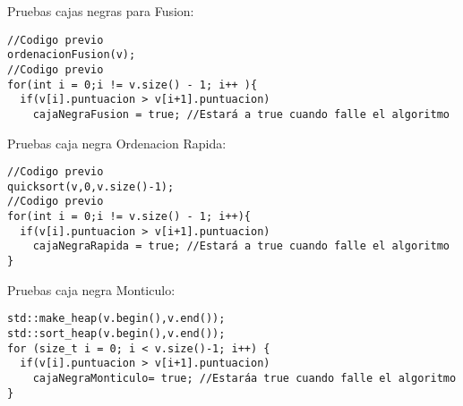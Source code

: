 Pruebas cajas negras para Fusion:
\begin{lstlisting}
//Codigo previo
ordenacionFusion(v);
//Codigo previo
for(int i = 0;i != v.size() - 1; i++ ){
  if(v[i].puntuacion > v[i+1].puntuacion)
    cajaNegraFusion = true; //Estará a true cuando falle el algoritmo
\end{lstlisting}

Pruebas caja negra Ordenacion Rapida:
\begin{lstlisting}
//Codigo previo
quicksort(v,0,v.size()-1);
//Codigo previo
for(int i = 0;i != v.size() - 1; i++){
  if(v[i].puntuacion > v[i+1].puntuacion)
    cajaNegraRapida = true; //Estará a true cuando falle el algoritmo
}
\end{lstlisting}

Pruebas caja negra Monticulo:
\begin{lstlisting}
std::make_heap(v.begin(),v.end());
std::sort_heap(v.begin(),v.end());
for (size_t i = 0; i < v.size()-1; i++) {
  if(v[i].puntuacion > v[i+1].puntuacion)
    cajaNegraMonticulo= true; //Estaráa true cuando falle el algoritmo
}
\end{lstlisting}
